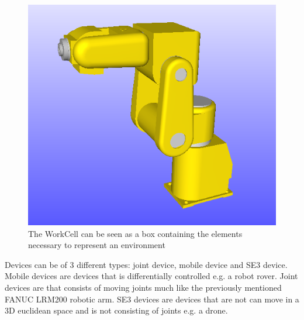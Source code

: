 \begin{figure}[h]
	\centering
	\includegraphics[scale=0.55]{Figures/FANUCLRM200.png}
	\caption{The WorkCell can be seen as a box containing the elements necessary to represent an environment}
	\label{fig:FANUCLRM200}
\end{figure}

Devices can be of 3 different types: joint device, mobile device and SE3 device. Mobile devices are devices that  is differentially controlled e.g. a robot rover. Joint devices are that consists of moving joints much like the previously mentioned FANUC LRM200 robotic arm. SE3 devices are devices that are not can move in a 3D euclidean space and is not consisting of joints e.g. a drone.\\


